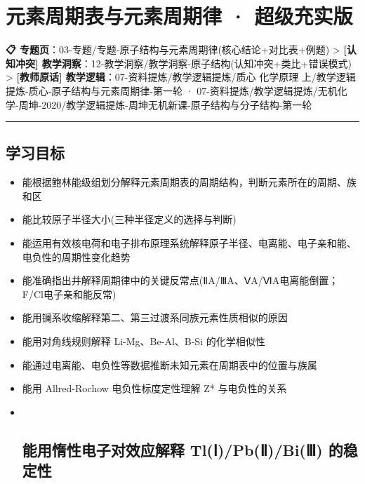 \section{元素周期表与元素周期律 · 超级充实版}\label{ux5143ux7d20ux5468ux671fux8868ux4e0eux5143ux7d20ux5468ux671fux5f8b-ux8d85ux7ea7ux5145ux5b9eux7248}

\textbf{📋 专题页}：03-专题/专题-原子结构与元素周期律(核心结论+对比表+例题)
\textgreater{} \textbf{{[}认知冲突{]} 教学洞察}：12-教学洞察/教学洞察-原子结构(认知冲突+类比+错误模式)
\textgreater{} \textbf{{[}教师原话{]} 教学逻辑}：07-资料提炼/教学逻辑提炼/质心 化学原理 上/教学逻辑提炼-质心-原子结构与元素周期律-第一轮 · 07-资料提炼/教学逻辑提炼/无机化学-周坤-2020/教学逻辑提炼-周坤无机新课-原子结构与分子结构-第一轮

\begin{center}\rule{0.5\linewidth}{0.5pt}\end{center}

\subsection{学习目标}\label{ux5b66ux4e60ux76eeux6807}

\begin{itemize}
\item
  能根据鲍林能级组划分解释元素周期表的周期结构，判断元素所在的周期、族和区
\item
  能比较原子半径大小(三种半径定义的选择与判断)
\item
  能运用有效核电荷和电子排布原理系统解释原子半径、电离能、电子亲和能、电负性的周期性变化趋势
\item
  能准确指出并解释周期律中的关键反常点(ⅡA/ⅢA、ⅤA/ⅥA电离能倒置；F/Cl电子亲和能反常)
\item
  能用镧系收缩解释第二、第三过渡系同族元素性质相似的原因
\item
  能用对角线规则解释 Li-Mg、Be-Al、B-Si 的化学相似性
\item
  能通过电离能、电负性等数据推断未知元素在周期表中的位置与族属
\item
  能用 Allred-Rochow 电负性标度定性理解 Z* 与电负性的关系
\item ~
  \subsection{能用惰性电子对效应解释 Tl(Ⅰ)/Pb(Ⅱ)/Bi(Ⅲ) 的稳定性}\label{ux80fdux7528ux60f0ux6027ux7535ux5b50ux5bf9ux6548ux5e94ux89e3ux91ca-tlux2170pbux2171biux2172-ux7684ux7a33ux5b9aux6027}
\end{itemize}

